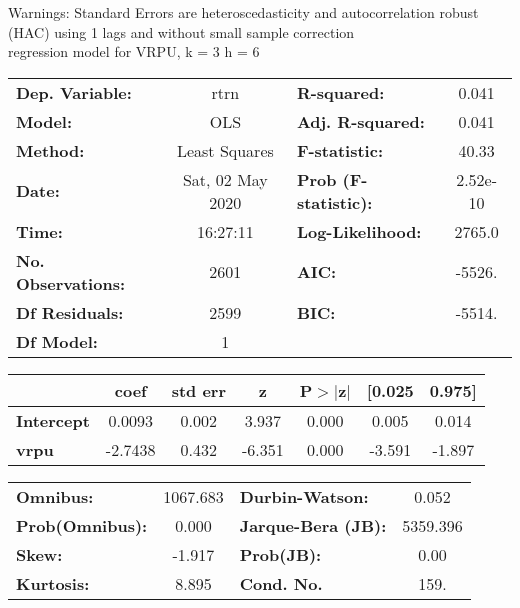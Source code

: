 Warnings: \newline
 [1] Standard Errors are heteroscedasticity and autocorrelation robust (HAC) using 1 lags and without small sample correction\\ 

regression model for VRPU, k = 3 h = 6\begin{center}
\begin{tabular}{lclc}
\toprule
\textbf{Dep. Variable:}    &       rtrn       & \textbf{  R-squared:         } &     0.041   \\
\textbf{Model:}            &       OLS        & \textbf{  Adj. R-squared:    } &     0.041   \\
\textbf{Method:}           &  Least Squares   & \textbf{  F-statistic:       } &     40.33   \\
\textbf{Date:}             & Sat, 02 May 2020 & \textbf{  Prob (F-statistic):} &  2.52e-10   \\
\textbf{Time:}             &     16:27:11     & \textbf{  Log-Likelihood:    } &    2765.0   \\
\textbf{No. Observations:} &        2601      & \textbf{  AIC:               } &    -5526.   \\
\textbf{Df Residuals:}     &        2599      & \textbf{  BIC:               } &    -5514.   \\
\textbf{Df Model:}         &           1      & \textbf{                     } &             \\
\bottomrule
\end{tabular}
\begin{tabular}{lcccccc}
                   & \textbf{coef} & \textbf{std err} & \textbf{z} & \textbf{P$> |$z$|$} & \textbf{[0.025} & \textbf{0.975]}  \\
\midrule
\textbf{Intercept} &       0.0093  &        0.002     &     3.937  &         0.000        &        0.005    &        0.014     \\
\textbf{vrpu}      &      -2.7438  &        0.432     &    -6.351  &         0.000        &       -3.591    &       -1.897     \\
\bottomrule
\end{tabular}
\begin{tabular}{lclc}
\textbf{Omnibus:}       & 1067.683 & \textbf{  Durbin-Watson:     } &    0.052  \\
\textbf{Prob(Omnibus):} &   0.000  & \textbf{  Jarque-Bera (JB):  } & 5359.396  \\
\textbf{Skew:}          &  -1.917  & \textbf{  Prob(JB):          } &     0.00  \\
\textbf{Kurtosis:}      &   8.895  & \textbf{  Cond. No.          } &     159.  \\
\bottomrule
\end{tabular}
\end{center}

